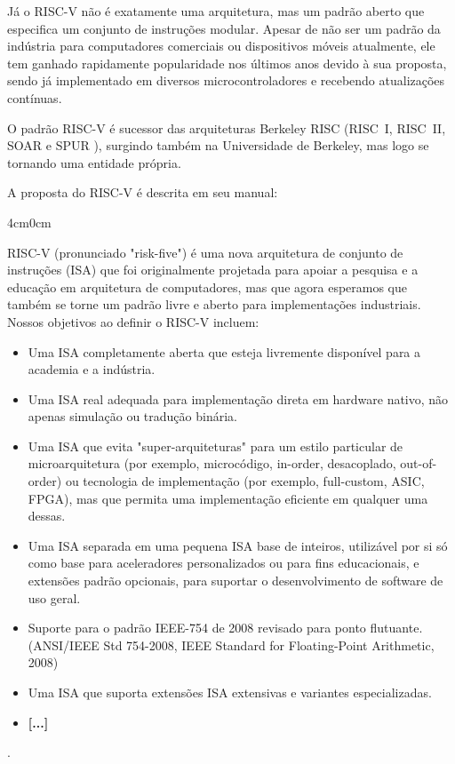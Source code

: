 \documentclass[
	12pt,				%
	openright,			%
	oneside,			%
	a4paper,			%
	english,			%
	french,				%
	spanish,			%
	brazil,				%
	]{abntex2}
\begin{document}
Já o RISC-V \cite{risc-v_risc-v_2024} não é exatamente uma arquitetura, mas um padrão aberto que especifica um conjunto de instruções modular. Apesar de não ser um padrão da indústria para computadores comerciais ou dispositivos móveis atualmente, ele tem ganhado rapidamente popularidade nos últimos anos devido à sua proposta, sendo já implementado em diversos microcontroladores e recebendo atualizações contínuas.

O padrão RISC-V é sucessor das arquiteturas Berkeley RISC (RISC~I, RISC~II, SOAR e SPUR \cite[p.10]{risc-v_risc-v_2024}), surgindo também na Universidade de Berkeley, mas logo se tornando uma entidade própria.

A proposta do RISC-V é descrita em seu manual:
\vspace{1.5cm} %
\begin{adjustwidth}{4cm}{0cm} %
\fontsize{10pt}{12pt}\selectfont

RISC-V (pronunciado "risk-five") é uma nova arquitetura de conjunto de instruções (ISA) que foi originalmente projetada para apoiar a pesquisa e a educação em arquitetura de computadores, mas que agora esperamos que também se torne um padrão livre e aberto para implementações industriais. Nossos objetivos ao definir o RISC-V incluem:

\begin{itemize}
    \item Uma ISA completamente aberta que esteja livremente disponível para a academia e a indústria.
    \item Uma ISA real adequada para implementação direta em hardware nativo, não apenas simulação ou tradução binária.
    \item Uma ISA que evita "super-arquiteturas" para um estilo particular de microarquitetura (por exemplo, microcódigo, in-order, desacoplado, out-of-order) ou tecnologia de implementação (por exemplo, full-custom, ASIC, FPGA), mas que permita uma implementação eficiente em qualquer uma dessas.
    \item Uma ISA separada em uma pequena ISA base de inteiros, utilizável por si só como base para aceleradores personalizados ou para fins educacionais, e extensões padrão opcionais, para suportar o desenvolvimento de software de uso geral.
    \item Suporte para o padrão IEEE-754 de 2008 revisado para ponto flutuante. (ANSI/IEEE Std 754-2008, IEEE Standard for Floating-Point Arithmetic, 2008)
    \item Uma ISA que suporta extensões ISA extensivas e variantes especializadas.
    \item \textbf{[...]}
\end{itemize}
\cite{risc-v_risc-v_2024}.
\end{adjustwidth}
\end{document}
